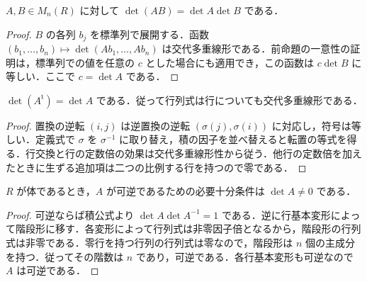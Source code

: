 \begin{prop}[行列式の積公式]
$A,B\in M_n(R)$ に対して $\det(AB)=\det A\det B$ である．
\end{prop}
\begin{proof}
$B$ の各列 $b_j$ を標準列で展開する．函数 $(b_1,\ldots,b_n)\mapsto\det(Ab_1,\ldots,Ab_n)$ は交代多重線形である．前命題の一意性の証明は，標準列での値を任意の $c$ とした場合にも適用でき，この函数は $c\det B$ に等しい．ここで $c=\det A$ である．
\end{proof}
\begin{prop}[転置と行基本変形]
$\det(A^{\mathrm t})=\det A$ である．従って行列式は行についても交代多重線形である．
\end{prop}
\begin{proof}
置換の逆転 $(i,j)$ は逆置換の逆転 $(\sigma(j),\sigma(i))$ に対応し，符号は等しい．定義式で $\sigma$ を $\sigma^{-1}$ に取り替え，積の因子を並べ替えると転置の等式を得る．行交換と行の定数倍の効果は交代多重線形性から従う．他行の定数倍を加えたときに生ずる追加項は二つの比例する行を持つので零である．
\end{proof}
\begin{prop}[行列式と可逆性]
$R$ が体であるとき，$A$ が可逆であるための必要十分条件は $\det A\ne0$ である．
\end{prop}
\begin{proof}
可逆ならば積公式より $\det A\det A^{-1}=1$ である．逆に行基本変形によって階段形に移す．各変形によって行列式は非零因子倍となるから，階段形の行列式は非零である．零行を持つ行列の行列式は零なので，階段形は $n$ 個の主成分を持つ．従ってその階数は $n$ であり，可逆である．各行基本変形も可逆なので $A$ は可逆である．
\end{proof}

